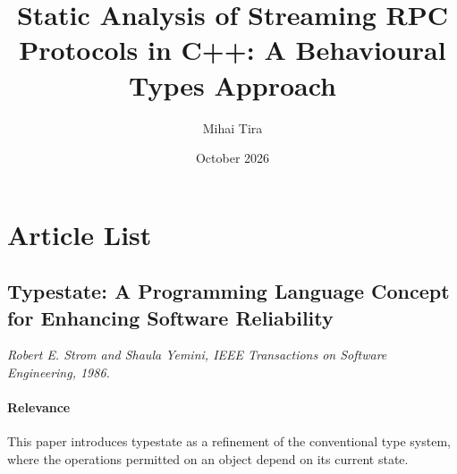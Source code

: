 \documentclass{article}
\title{Static Analysis of Streaming RPC Protocols in C++: A Behavioural Types Approach}
\author{Mihai Tira}
\date{October 2026}
\begin{document}
\maketitle

\section{Article List}

\subsection{Typestate: A Programming Language Concept for Enhancing Software Reliability}
\textit{Robert E. Strom and Shaula Yemini, IEEE Transactions on Software Engineering, 1986.}~\cite{strom-yemini-1986}

\paragraph{Relevance}
This paper introduces typestate as a refinement of the conventional type
system, where the operations permitted on an object depend on its current
state.
\end{document}
